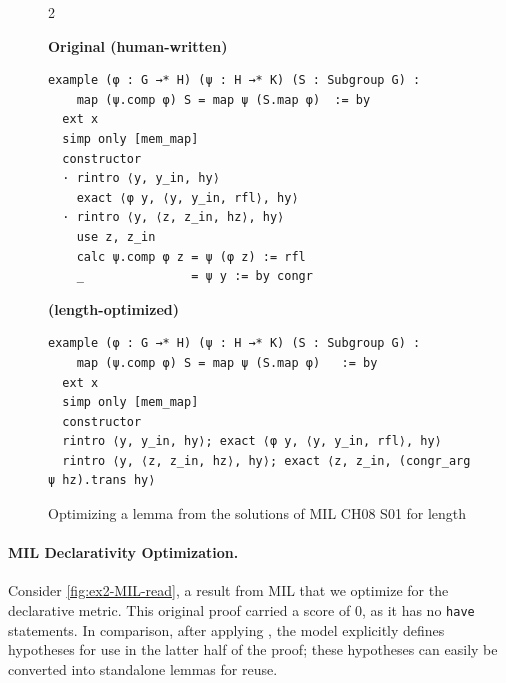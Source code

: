 \setlength{\columnsep}{0.2cm}
\begin{figure}[ht]
\begin{multicols}{2}

{
\textbf{Original (human-written)}
\begin{scriptsize}
\begin{lstlisting}[basicstyle=\scriptsize\ttfamily]
example (φ : G →* H) (ψ : H →* K) (S : Subgroup G) :
    map (ψ.comp φ) S = map ψ (S.map φ)  := by
  ext x
  simp only [mem_map]
  constructor
  · rintro ⟨y, y_in, hy⟩
    exact ⟨φ y, ⟨y, y_in, rfl⟩, hy⟩
  · rintro ⟨y, ⟨z, z_in, hz⟩, hy⟩
    use z, z_in
    calc ψ.comp φ z = ψ (φ z) := rfl
    _               = ψ y := by congr
\end{lstlisting}
\end{scriptsize}
}
\vfill\null
\columnbreak
{
\textbf{\methodname{} (length-optimized)}
\begin{scriptsize}
\begin{lstlisting}[basicstyle=\scriptsize\ttfamily]
example (φ : G →* H) (ψ : H →* K) (S : Subgroup G) :
    map (ψ.comp φ) S = map ψ (S.map φ)   := by
  ext x
  simp only [mem_map]
  constructor
  rintro ⟨y, y_in, hy⟩; exact ⟨φ y, ⟨y, y_in, rfl⟩, hy⟩
  rintro ⟨y, ⟨z, z_in, hz⟩, hy⟩; exact ⟨z, z_in, (congr_arg ψ hz).trans hy⟩
\end{lstlisting}
\end{scriptsize}
}
\end{multicols}
\vspace{-2.5em}
\caption{Optimizing a lemma from the solutions of MIL CH08 S01 for length}
\label{fig:mil-len}
\end{figure}

\vspace{15px}
\paragraph{MIL Declarativity Optimization.}
\label{ex2}
Consider \autoref{fig:ex2-MIL-read}, a result from MIL that we optimize for the declarative metric. This original proof carried a score of $0$, as it has no \texttt{have} statements. In comparison, after applying \methodname{}, the model explicitly defines hypotheses for use in the latter half of the proof; these hypotheses can easily be converted into standalone lemmas for reuse.



